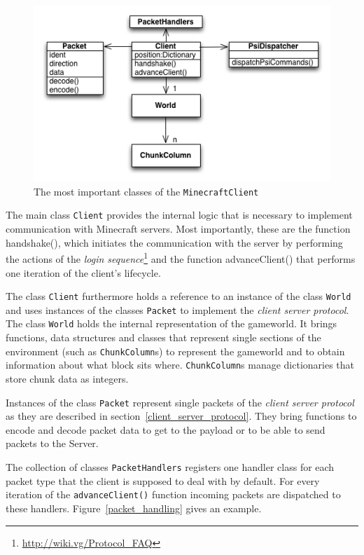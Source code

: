 \begin{figure}[h]
  \centering
    \includegraphics[width=12cm]{graphics/spockUML_v14}
  \caption{The most important classes of the \texttt{MinecraftClient}}
  \label{spock_UML}
\end{figure}

The main class \texttt{Client} provides the internal logic that is necessary to implement communication with Minecraft servers. Most importantly, these are the function handshake(), which initiates the communication with the server by performing the actions of the \emph{login sequence}\footnote{\url{http://wiki.vg/Protocol_FAQ}} and the function advanceClient() that performs one iteration of the client's lifecycle.


The class \texttt{Client} furthermore holds a reference to an instance of the class \texttt{World} and uses instances of the classes \texttt{Packet} to implement the \emph{client server protocol}. The class \texttt{World} holds the internal representation of the gameworld. It brings functions, data structures and classes that represent single sections of the environment (such as \texttt{ChunkColumn}s) to represent the gameworld and to obtain information about what block sits where. \texttt{ChunkColumn}s manage dictionaries that store chunk data as integers.

Instances of the class \texttt{Packet} represent single packets of the \emph{client server protocol} as they are described in section~\ref{client_server_protocol}. They bring functions to encode and decode packet data to get to the payload or to be able to send packets to the Server.

The collection of classes \texttt{PacketHandlers} registers one handler class for each packet type that the client is supposed to deal with by default. For every iteration of the \texttt{advanceClient()} function incoming packets are dispatched to these handlers. Figure~\ref{packet_handling} gives an example.


